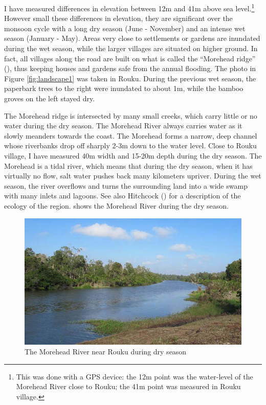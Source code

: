 I have measured differences in elevation between 12m and 41m above sea level.\footnote{This was done with a GPS device: the 12m point was the water-level of the Morehead River close to Rouku; the 41m point was measured in Rouku village.} However small these differences in elevation, they are significant over the monsoon cycle with a long dry season (June - November) and an intense wet season (January - May). Areas very close to settlements or gardens are inundated during the wet season, while the larger villages are situated on higher ground. In fact, all villages along the road are built on what is called the ``Morehead ridge'' (\citealt[15]{Paijmans:1971morehead}), thus keeping houses and gardens safe from the annual flooding. The photo in Figure \ref{fig:landscape1} was taken in Rouku. During the previous wet season, the paperbark trees to the right were inundated to about 1m, while the bamboo groves on the left stayed dry.
  
 \largerpage[2] 
The Morehead ridge is intersected by many small creeks, which carry little or no water during the dry season. The Morehead River always carries water as it slowly meanders towards the coast. The Morehead forms a narrow, deep channel whose riverbanks drop off sharply 2-3m down to the water level. Close to Rouku village, I have measured 40m width and 15-20m depth during the dry season. The Morehead is a tidal river, which means that during the dry season, when it has virtually no flow, salt water pushes back many kilometers upriver. During the wet season, the river overflows and turns the surrounding land into a wide swamp with many inlets and lagoons. See also Hitchcock (\citeyear[100]{Hitchcock:2004vk}) for a description of the ecology of the region.  shows the Morehead River during the dry season.

\newpage
\begin{figure}[t]
    \includegraphics[width=.85\textwidth]{figures/landscape2.jpg}
  \caption[Morehead River]{The Morehead River near Rouku during dry season}
  \label{fig:landscape2}
\end{figure}%

